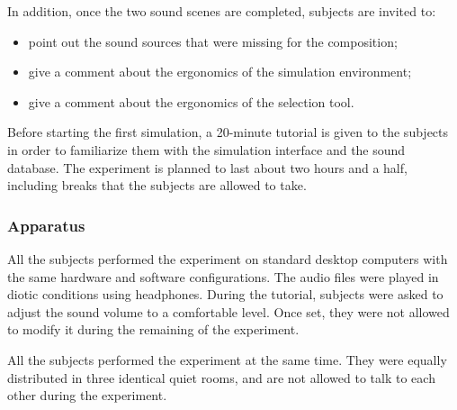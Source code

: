 \documentclass[12pt]{elsarticle}
\begin{document}
In addition, once the two sound scenes are completed, subjects are invited to:

\begin{itemize}
\item  point out the sound sources that were missing for the composition;
\item  give a comment about the ergonomics of the simulation environment;
\item  give a comment about the ergonomics of the selection tool.
\end{itemize}


Before starting the first simulation, a 20-minute tutorial is given to the subjects in order to familiarize them with the simulation interface and the sound database. The experiment is planned to last about two hours and a half, including breaks that the subjects are allowed to take.

\subsubsection*{Apparatus}


All the subjects performed the experiment on standard desktop computers with the same hardware and software configurations. The audio files were played in diotic conditions using headphones. During the tutorial, subjects were asked to adjust the sound volume to a comfortable level. Once set, they were not allowed to modify it during the remaining of the experiment.


All the subjects performed the experiment at the same time. They were equally distributed in three identical quiet rooms, and are not allowed to talk to each other during the experiment.
\end{document}

